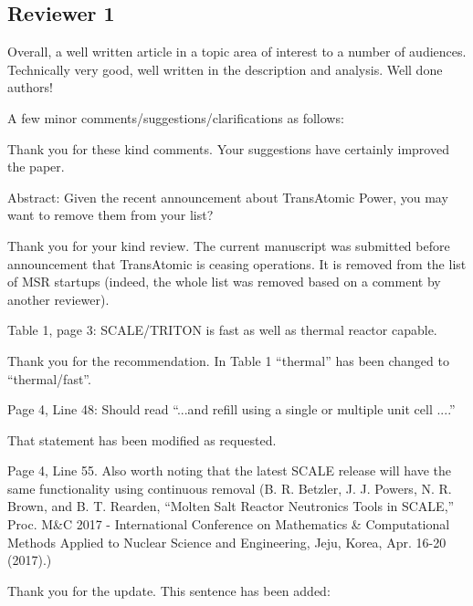 \documentclass[answers,11pt]{exam}
\begin{document}
\begin{questions}
        \section*{Reviewer 1}

        \question Overall, a well written article in a topic area of interest 
        to a number of audiences. Technically very good, well written in the 
        description and analysis.  Well done authors! 


        A few minor comments/suggestions/clarifications as follows:
        \begin{solution}
                Thank you for these kind comments. Your suggestions have 
                certainly improved the paper. 
        \end{solution}


        \question  Abstract: Given the recent announcement about TransAtomic 
        Power, you may want to remove them from your list?
        \begin{solution}
        		Thank you for your kind review. The current manuscript was submitted before 
		        announcement that TransAtomic is ceasing operations. It is removed from 
                        the list of MSR startups (indeed, the whole list was 
                        removed based on a comment by another reviewer).
        \end{solution}

        \question  Table 1, page 3: SCALE/TRITON is fast as well as thermal 
        reactor capable.  
        \begin{solution}
		        Thank you for the recommendation. In Table 1 ``thermal'' has been changed 
		        to ``thermal/fast''.
        \end{solution}

        \question  Page 4, Line 48: Should read ``...and refill using a single 
        or multiple unit cell ....''
        \begin{solution}
        		That statement has been modified as requested.
        \end{solution}

        \question  Page 4, Line 55. Also worth noting that the latest SCALE 
        release will have the same functionality using continuous removal (B. 
        R. Betzler, J. J. Powers, N. R. Brown, and B. T. Rearden, ``Molten Salt 
        Reactor Neutronics Tools in SCALE,'' Proc. M\&C 2017 - International 
        Conference on Mathematics \& Computational Methods Applied to Nuclear 
        Science and Engineering, Jeju, Korea, Apr. 16-20 (2017).)
        \begin{solution}
		        Thank you for the update. This sentence has been added:
        

\end{solution}
\end{questions}
\end{document}
